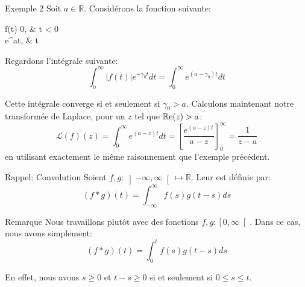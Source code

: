 \documentclass[a4paper]{article}
\begin{document}
\begin{parag}{Exemple 2}
    Soit $a \in \mathbb{R}$. Considérons la fonction suivante: 
    \begin{functionbypart}{f\left(t\right)} 
    0, &  t < 0 \\
    e^{at}, &  t 
    \end{functionbypart}
    
    Regardons l'intégrale suivante: 
    \[\int_{0}^{\infty} \left|f\left(t\right)\right|e^{-\gamma_0 t} dt = \int_{0}^{\infty} e^{\left(a - \gamma_0\right)t} dt\]
    
    Cette intégrale converge si et seulement si $\gamma_0 > a$. Calculons maintenant notre transformée de Laplace, pour un $z$ tel que $\cre\left(z\right) > a$: 
    \[\mathcal{L}\left(f\right)\left(z\right) = \int_{0}^{\infty} e^{\left(a - z\right)t}dt = \left[\frac{e^{\left(a - z\right)t}}{a - z}\right]_{0}^{\infty} = \frac{1}{z-a} \]
    en utilisant exactement le même raisonnement que l'exemple précédent.
\end{parag}

\begin{parag}{Rappel: Convolution}
    Soient $f, g: \left]-\infty, \infty\right[  \mapsto \mathbb{R}$. Leur  est définie par: 
    \[\left(f*g\right)\left(t\right) = \int_{-\infty}^{\infty} f\left(s\right) g\left(t - s\right)ds\]

    \begin{subparag}{Remarque}
        Nous travaillons plutôt avec des fonctions $f, g: \left[0, \infty\right[ $. Dans ce cas, nous avons simplement: 
        \[\left(f*g\right)\left(t\right) = \int_{0}^{t} f\left(s\right) g\left(t-s\right)ds\]

        En effet, nous avons $s \geq 0$ et $t - s \geq 0$ si et seulement si $0 \leq s \leq t$.
    \end{subparag}
\end{parag}
\end{document}
